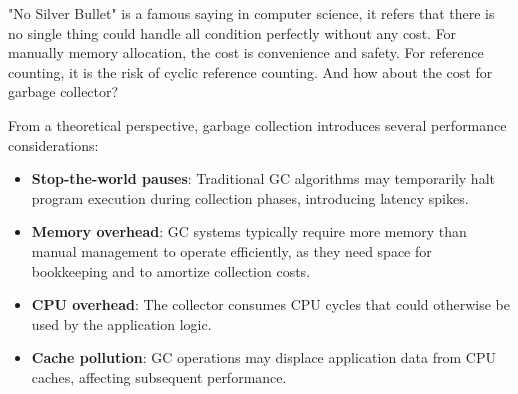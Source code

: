 "No Silver Bullet" is a famous saying in computer science, it refers that there is no single thing could handle all condition perfectly without any cost. For manually memory allocation, the cost is convenience and safety. For reference counting, it is the risk of cyclic reference counting. And how about the cost for garbage collector?

From a theoretical perspective, garbage collection introduces several performance considerations:

\begin{itemize}
    \item \textbf{Stop-the-world pauses}: Traditional GC algorithms may temporarily halt program execution during collection phases, introducing latency spikes.
    \item \textbf{Memory overhead}: GC systems typically require more memory than manual management to operate efficiently, as they need space for bookkeeping and to amortize collection costs.
    \item \textbf{CPU overhead}: The collector consumes CPU cycles that could otherwise be used by the application logic.
    \item \textbf{Cache pollution}: GC operations may displace application data from CPU caches, affecting subsequent performance.
\end{itemize}